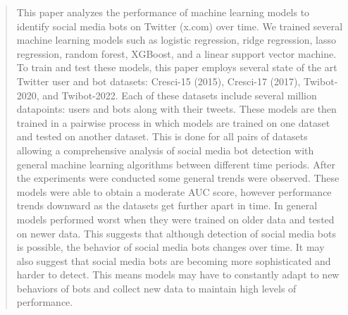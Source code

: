 \begin{abstract}
This paper analyzes the performance of machine learning models to identify social media bots on Twitter (x.com) over time. We trained several machine learning models such as logistic regression, ridge regression, lasso regression, random forest, XGBoost, and a linear support vector machine. To train and test these models, this paper employs several state of the art Twitter user and bot datasets: Cresci-15 (2015), Cresci-17 (2017), Twibot-2020, and Twibot-2022. Each of these datasets include several million datapoints: users and bots along with their tweets. These models are then trained in a pairwise process in which models are trained on one dataset and tested on another dataset. This is done for all pairs of datasets allowing a comprehensive analysis of social media bot detection with general machine learning algorithms between different time periods. After the experiments were conducted some general trends were observed. These models were able to obtain a moderate AUC score, however performance trends downward as the datasets get further apart in time. In general models performed worst when they were trained on older data and tested on newer data. This suggests that although detection of social media bots is possible, the behavior of social media bots changes over time. It may also suggest that social media bots are becoming more sophisticated and harder to detect. This means models may have to constantly adapt to new behaviors of bots and collect new data to maintain high levels of performance. 
\end{abstract}

